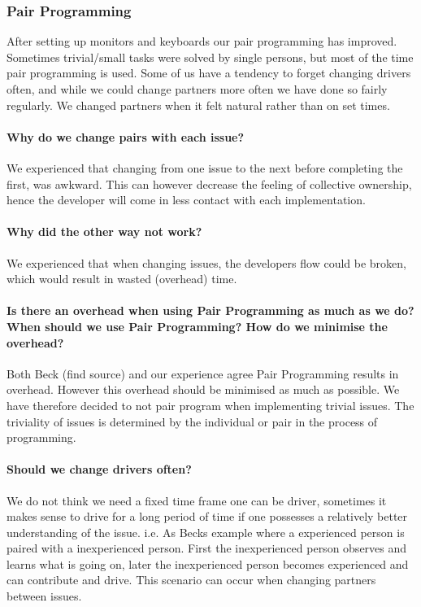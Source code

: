 \subsubsection{Pair Programming}
After setting up monitors and keyboards our pair programming has improved. Sometimes trivial/small tasks were solved by single persons, but most of the time pair programming is used.
Some of us have a tendency to forget changing drivers often, and while we could change partners more often we have done so fairly regularly. We changed partners when it felt natural rather than on set times.

\paragraph{Why do we change pairs with each issue?}
We experienced that changing from one issue to the next before completing the first, was awkward.
This can however decrease the feeling of collective ownership, hence the developer will come in less contact with each implementation.

\paragraph{Why did the other way not work?}
We experienced that when changing issues, the developers flow could be broken, which would result in wasted (overhead) time.

\paragraph{Is there an overhead when using Pair Programming as much as we do? When should we use Pair Programming? How do we minimise the overhead?}
Both Beck (find source) and our experience agree Pair Programming results in overhead.
However this overhead should be minimised as much as possible. We have therefore decided to not pair program when implementing trivial issues. The triviality of issues is determined by the individual or pair in the process of programming.

\paragraph{Should we change drivers often?}
We do not think we need a fixed time frame one can be driver, sometimes it makes sense to drive for a long period of time if one possesses a relatively better understanding of the issue. 
i.e. As Becks example where a experienced person is paired with a inexperienced person. First the inexperienced person observes and learns what is going on, later the inexperienced person becomes experienced and can contribute and drive. This scenario can occur when changing partners between issues.

